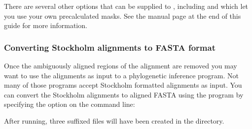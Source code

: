 There are several other options that can be supplied to
, including  and  which let you 
use your own precalculated masks. See the 
manual page at the end of this guide for more information. 

\subsubsection{Converting Stockholm alignments to FASTA format}
Once the ambiguously aligned regions of the alignment are removed you may
want to use the alignments as input to a phylogenetic inference
program. Not many of those programs accept Stockholm formatted
alignments as input. You can convert the Stockholm alignments to aligned FASTA
using the  program by specifying the 
option on the command line:


After running, three  suffixed files will have been created
in the  directory.




